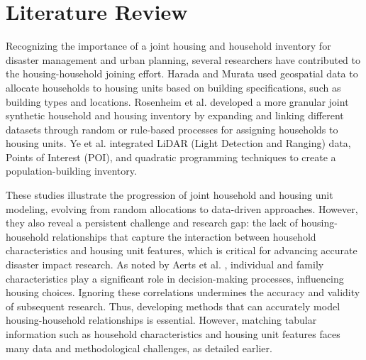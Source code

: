 \documentclass[]{nature_mod}
\begin{document}
\section{Literature Review}
Recognizing the importance of a joint housing and household inventory for disaster management and urban planning, several researchers have contributed to the housing-household joining effort. Harada and Murata \cite{harada2017projecting} used geospatial data to allocate households to housing units based on building specifications, such as building types and locations. Rosenheim et al. \cite{rosenheim2021integration} developed a more granular joint synthetic household and housing inventory by expanding and linking different datasets through random or rule-based processes for assigning households to housing units. Ye et al. \cite{ye2024enhancing} integrated LiDAR (Light Detection and Ranging) data, Points of Interest (POI), and quadratic programming techniques to create a population-building inventory. 

These studies illustrate the progression of joint household and housing unit modeling, evolving from random allocations to data-driven approaches. However, they also reveal a persistent challenge and research gap: the lack of housing-household relationships that capture the interaction between household characteristics and housing unit features, which is critical for advancing accurate disaster impact research. As noted by Aerts et al. \cite{aerts2018integrating}, individual and family characteristics play a significant role in decision-making processes, influencing housing choices. Ignoring these correlations undermines the accuracy and validity of subsequent research. Thus, developing methods that can accurately model housing-household relationships is essential. However, matching tabular information such as household characteristics and housing unit features faces many data and methodological challenges, as detailed earlier. 
\end{document}
